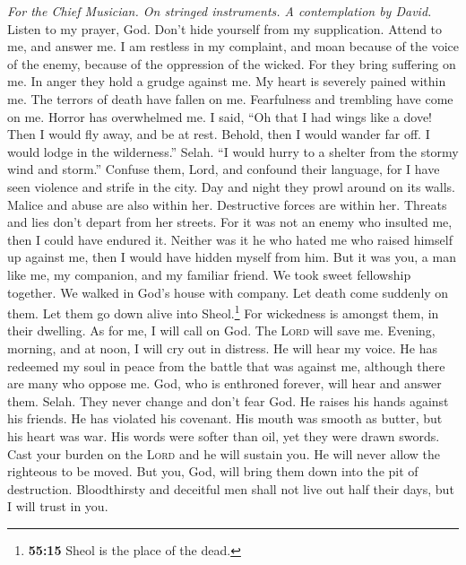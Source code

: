 \emph{For the Chief Musician. On stringed instruments. A contemplation
by David.}\\
 Listen to my prayer, God. Don't hide yourself from my
supplication.  Attend to me, and answer me. I am restless
in my complaint, and moan  because of the voice of the
enemy, because of the oppression of the wicked. For they bring suffering
on me. In anger they hold a grudge against me.  My heart
is severely pained within me. The terrors of death have fallen on me.
 Fearfulness and trembling have come on me. Horror has
overwhelmed me.  I said, ``Oh that I had wings like a
dove! Then I would fly away, and be at rest.  Behold, then
I would wander far off. I would lodge in the wilderness.'' Selah.
 ``I would hurry to a shelter from the stormy wind and
storm.''  Confuse them, Lord, and confound their language,
for I have seen violence and strife in the city.  Day and
night they prowl around on its walls. Malice and abuse are also within
her.  Destructive forces are within her. Threats and lies
don't depart from her streets.  For it was not an enemy
who insulted me, then I could have endured it. Neither was it he who
hated me who raised himself up against me, then I would have hidden
myself from him.  But it was you, a man like me, my
companion, and my familiar friend.  We took sweet
fellowship together. We walked in God's house with company.
 Let death come suddenly on them. Let them go down alive
into Sheol.\footnote{\textbf{55:15} Sheol is the place of the dead.} For
wickedness is amongst them, in their dwelling.  As for
me, I will call on God. The \textsc{Lord} will save me. 
Evening, morning, and at noon, I will cry out in distress. He will hear
my voice.  He has redeemed my soul in peace from the
battle that was against me, although there are many who oppose me.
 God, who is enthroned forever, will hear and answer
them. Selah. They never change and don't fear God.  He
raises his hands against his friends. He has violated his covenant.
 His mouth was smooth as butter, but his heart was war.
His words were softer than oil, yet they were drawn swords.
 Cast your burden on the \textsc{Lord} and he will
sustain you. He will never allow the righteous to be moved.
 But you, God, will bring them down into the pit of
destruction. Bloodthirsty and deceitful men shall not live out half
their days, but I will trust in you.


